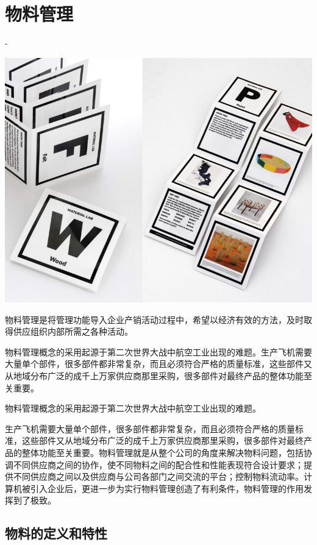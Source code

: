 \section {物料管理}

-

    \begin{center}
        \includegraphics[scale=.3] {cards.jpg}
    \end{center}

    物料管理是将管理功能导入企业产销活动过程中，希望以经济有效的方法，及时取得供应组织内部所需之各种活动。

    物料管理概念的采用起源于第二次世界大战中航空工业出现的难题。生产飞机需要大量单个部件，很多部件都非常复杂，而且必须符合严格的质量标准，这些部件又从地域分布广泛的成千上万家供应商那里采购，很多部件对最终产品的整体功能至关重要。

    物料管理概念的采用起源于第二次世界大战中航空工业出现的难题。

    生产飞机需要大量单个部件，很多部件都非常复杂，而且必须符合严格的质量标准，这些部件又从地域分布广泛的成千上万家供应商那里采购，很多部件对最终产品的整体功能至关重要。物料管理就是从整个公司的角度来解决物料问题，包括协调不同供应商之间的协作，使不同物料之间的配合性和性能表现符合设计要求；提供不同供应商之间以及供应商与公司各部门之间交流的平台；控制物料流动率。计算机被引入企业后，更进一步为实行物料管理创造了有利条件，物料管理的作用发挥到了极致。

\subsection {物料的定义和特性}

